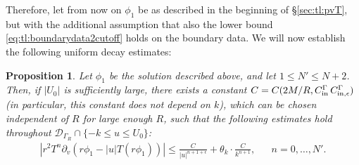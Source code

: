\documentclass[11pt,english]{article}
\numberwithin{equation}{section}
\theoremstyle{remark}
\theoremstyle{plain}
\newtheorem{prop}{Proposition}[section]
\theoremstyle{remark}
\newcommand{\pv}{\partial_v}
\renewcommand{\(}{\left(}
\renewcommand{\)}{\right)}
\begin{document}
Therefore, let from now on $\phi_1$ be as described in the beginning of \S \ref{sec:tl:pvT}, but with the additional assumption that  also the lower bound \eqref{eq:tl:boundarydata2cutoff} holds on the boundary data.
We will now establish the following uniform decay estimates:
\begin{prop}\label{prop:tl:pvT-T2}
Let $\phi_1$ be the solution described above, and let $1\leq N'\leq N+2$. Then, if  $|U_0|$  is sufficiently large, there exists a constant $C=C(2M/R,C_{\mathrm{in}}^\Gamma\,C_{\mathrm{in},\epsilon}^\Gamma)$ (in particular, this constant does not depend on $k$), which can be chosen independent of $R$ for large enough $R$, such that the following estimates hold throughout $\mathcal{D}_{\Gamma_R}\cap\{-k\leq u\leq U_0\}$:
\begin{align}
\left|r^2T^n\pv\left(r\phi_1-|u|T(r\phi_1)\right)\right|\leq \frac{C}{|u|^{n+1+\epsilon}}+\theta_k\cdot \frac{C}{k^{n+1}},&& n=0,\dots,N'.
\end{align}
\end{prop}
\end{document}
